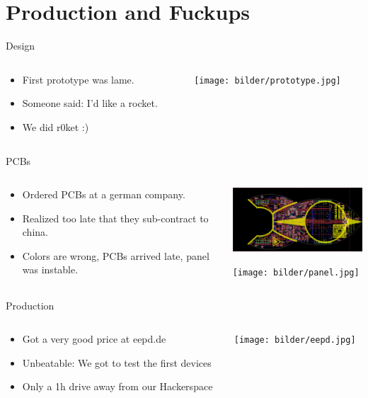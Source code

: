 \documentclass{beamer}
\begin{document}
\section{Production and Fuckups}
\begin{frame}{Design}
  \begin{columns}
    \begin{column}{6cm}
        \begin{itemize}
		\item First prototype was lame.
		\item Someone said: I'd like a rocket.
		\item We did r0ket :)
	\end{itemize}
    \end{column}
    \begin{column}{6cm}
        \texttt{[image: bilder/prototype.jpg]}
    \end{column}
  \end{columns}
\end{frame}
\begin{frame}{PCBs}
  \begin{columns}
    \begin{column}{6cm}
        \begin{itemize}
		\item Ordered PCBs at a german company.
		\item Realized too late that they sub-contract to china.
		\item Colors are wrong, PCBs arrived late, panel was instable.
	\end{itemize}
    \end{column}
    \begin{column}{6cm}
	\includegraphics[width=6cm]{bilder/eagle.png}

        \texttt{[image: bilder/panel.jpg]}
    \end{column}
  \end{columns}
\end{frame}
\begin{frame}{Production}
  \begin{columns}
    \begin{column}{6cm}
        \begin{itemize}
		\item Got a very good price at eepd.de
		\item Unbeatable: We got to test the first devices
		\item Only a 1h drive away from our Hackerspace
	\end{itemize}
    \end{column}
    \begin{column}{6cm}
        \texttt{[image: bilder/eepd.jpg]}
    \end{column}
  \end{columns}
\end{frame}
\end{document}

